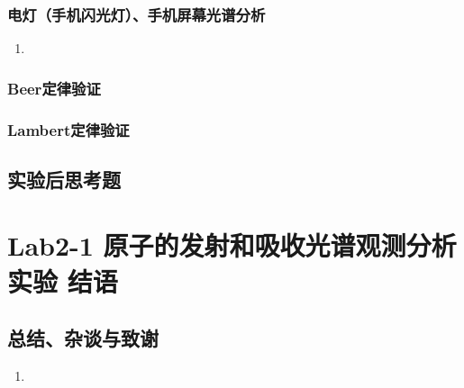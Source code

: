 \documentclass[dvipsnames, svgnames,a4paper,11pt]{article}
\begin{document}
	\subsubsection{电灯（手机闪光灯）、手机屏幕光谱分析}
	\begin{enumerate}
		\item 
	\end{enumerate}
	
	\subsubsection{Beer定律验证}
	
	\subsubsection{Lambert定律验证}
	
	
	\subsection{实验后思考题}
	
	\begin{question}
		
	\end{question}
	
	\begin{question}
		
	\end{question}
	
	\begin{question}
		
	\end{question}
	
	
	
	\clearpage
	
	\section{Lab2-1 原子的发射和吸收光谱观测分析实验 \quad\heiti 结语}
	
	\subsection{总结、杂谈与致谢}
	\begin{enumerate}
		\item 
	\end{enumerate}
	
\end{document}

